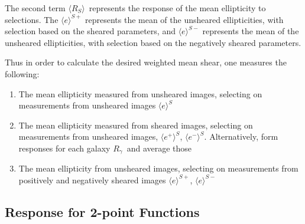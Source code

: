 \documentclass[a4paper,fleqn,usenatbib]{mnras}
\newcommand{\mest}{e}
\newcommand{\mcalRpsf}{$R^{p}$}
\newcommand{\mcalRg}{$R_{\gamma}$}
\newcommand{\mcalRSmean}{$\langle R_{S} \rangle$}
\begin{document}
The second term \mcalRSmean\ represents the response of the mean ellipticity to
selections.  The $\langle \mest \rangle^{S+}$ represents the mean of the
unsheared ellipticities, with selection based on the sheared parameters, and
$\langle \mest \rangle^{S-}$ represents the mean of the unsheared ellipticities,
with selection based on the negatively sheared parameters.





Thus in order to calculate the desired weighted mean shear, one measures the
following:
\begin{enumerate}
	\item The mean ellipticity measured from unsheared images, selecting on
        measurements from unsheared images $\langle e \rangle^S$
	\item The mean ellipticity measured from sheared images, selecting
        on measurements from unsheared images,  $\langle e^+ \rangle^S$, $\langle e^- \rangle^S$. Alternatively, form 
        responses for each galaxy \mcalRg\ and average those
    \item The mean ellipticity from unsheared images, selecting on measurements
        from positively and negatively sheared images $\langle e \rangle^{S+}$, $\langle e \rangle^{S-}$
\end{enumerate}





\subsection{Response for 2-point Functions} \label{sec:Rtwopt}
\end{document}
